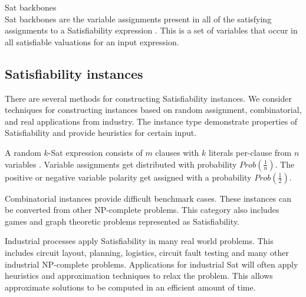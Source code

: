 \begin{definition}
{\sc Sat} backbones\\
{\sc Sat} backbones are the variable assignments present in all of the satisfying assignments to a {\sc Satisfiability} expression \cite{Zhang2001}.  This is a set of variables that occur in all satisfiable valuations for an input expression.  

\end{definition}



	\subsection{{\sc Satisfiability} instances}
		
There are several methods for constructing {\sc Satisfiability} instances.  We consider techniques for constructing instances based on random assignment, combinatorial, and real applications from industry.  The instance type demonstrate properties of {\sc Satisfiability} and provide heuristics for certain input.
	
A random $k$-{\sc Sat} expression consists of $m$ clauses with $k$ literals per-clause from  $n$ variables \cite{wilsonKsat}. Variable assignments get distributed with probability $Prob\left(\frac{1}{n}\right)$.  The positive or negative variable polarity get assigned with a probability $Prob\left(\frac{1}{2}\right)$.


		

Combinatorial instances provide difficult benchmark cases.  These instances can be converted from other \textsf{NP-complete} problems.  This category also includes games and graph theoretic problems represented as {\sc Satisfiability}. 
		
		

Industrial processes apply {\sc Satisfiability} in many real world problems.  This includes circuit layout, planning, logistics, circuit fault testing and many other industrial \textsf{NP-complete} problems.  Applications for industrial {\sc Sat} will often apply heuristics and approximation techniques to relax the problem.  This allows approximate solutions to be computed in an efficient amount of time.
		